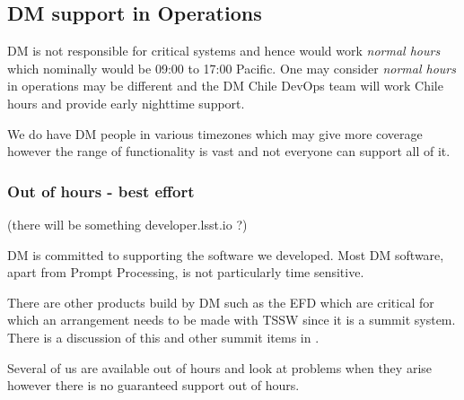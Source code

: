 \subsection{DM support in Operations} \label{sec:support}
DM is not responsible for critical systems and hence would work \emph{normal hours} which nominally would be 09:00 to 17:00 Pacific.
One may consider \emph{normal hours} in operations may be different and the DM Chile DevOps team will work Chile hours and provide early nighttime support.

We do have DM people in various timezones which may give more coverage however the range of functionality is vast and not everyone can support all of it.


\subsubsection{Out of hours - best effort}
(there will be something developer.lsst.io ?)


DM is committed to supporting the software we developed.
Most DM software, apart from Prompt Processing, is not particularly time sensitive.

There are other products build by DM such as the EFD which are critical for which an arrangement needs to be made with TSSW since it is a summit system. There is a discussion of this and other summit items in .


Several of us are available out of hours and look at problems when they arise however there is no guaranteed support out of hours.




